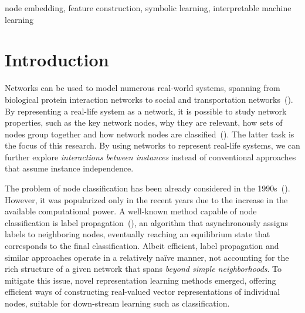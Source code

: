 \documentclass[twoside,11pt]{article}
\begin{document}
\begin{keywords}
node embedding,
feature construction,
symbolic learning,
interpretable machine learning
\end{keywords}

\section{Introduction}
\label{sec:introduction}
Networks can be used to model numerous real-world systems, spanning from biological protein interaction networks to social and transportation networks~(\cite{lu2011link,costa2011analyzing}). By representing a real-life system as a network, it is possible to study network properties, such as the key network nodes, why they are relevant, how sets of nodes group together and how network nodes are classified~(\cite{cai2018comprehensive,bhagat2011node}). The latter task is the focus of this research. By using networks to represent real-life systems, we can further explore \emph{interactions between instances} instead of conventional approaches that assume instance independence.

The problem of node classification has been already considered in the 1990s~(\cite{snets}). However, it was popularized only in the recent years due to the increase in the available computational power. A well-known method capable of node classification is label propagation~(\cite{zhu2002learning}), an algorithm that asynchronously assigns labels to neighboring nodes, eventually reaching an equilibrium state that corresponds to the final classification. Albeit efficient, label propagation and similar approaches operate in a relatively na\"ive manner, not accounting for the rich structure of a given network that spans \emph{beyond simple neighborhoods}. To mitigate this issue, novel representation learning methods emerged, offering efficient ways of constructing real-valued vector representations of individual nodes, suitable for down-stream learning such as classification.
\end{document}
